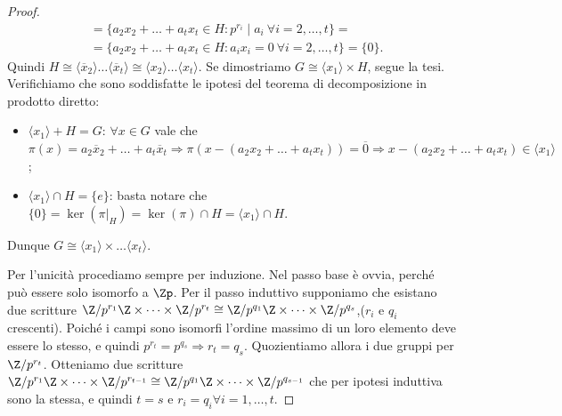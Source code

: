 \begin{proof}
\begin{align}
    & = \{a_2 x_2+\dots+a_t x_t \in H : p^{r_i} \mid a_i \ \forall i = 2,\dots, t\}  = \nonumber \\
    & = \{a_2 x_2+\dots+a_t x_t \in H : a_i x_i =  0 \ \forall i = 2,\dots, t\} = \{0\}. \nonumber 
    \end{align}
    Quindi $H \cong \langle \overline x_2 \rangle \dots \langle \overline x_t \rangle \cong \langle x_2 \rangle \dots  \langle  x_t \rangle$. Se dimostriamo $G \cong \langle x_1 \rangle \times H$, segue la tesi. Verifichiamo che sono soddisfatte le ipotesi del teorema di decomposizione in prodotto diretto: 
    \begin{itemize}
    \item $\langle x_1 \rangle + H  = G$: $\forall x \in G$ vale che $\pi(x) = a_2\overline x_2 + \dots + a_t \overline x_t \Rightarrow \pi(x - (a_2 x_2 + \dots + a_t  x_t)) = \overline0 \Rightarrow x - (a_2 x_2 + \dots + a_t  x_t) \in \langle x_1 \rangle$;
    \item $\langle x_1 \rangle \cap H = \{e\}$: basta notare che $\{0\} = \ker(\pi|_H) = \ker(\pi) \cap H = \langle x_1 \rangle \cap H.$
    \end{itemize}
    Dunque $G \cong \langle x_1 \rangle \times \dots \langle x_t \rangle$.

    Per l'unicità procediamo sempre per induzione. Nel passo base è ovvia, perché può essere solo isomorfo a $\Zp$. Per il passo induttivo supponiamo che esistano due scritture $\Z/p^{r_1}\Z \times \dots \times \Z/p^{r_t} \cong \Z/p^{q_1}\Z \times \dots \times \Z/p^{q_s}$,($r_i$ e $q_i$ crescenti). Poiché i campi sono isomorfi l'ordine massimo di un loro elemento deve essere lo stesso, e quindi  $p^{r_t} = p^{q_s} \Rightarrow r_t = q_s$. Quozientiamo allora i due gruppi per $\Z/p^{r_t}$. Otteniamo due scritture  $\Z/p^{r_1}\Z \times \dots \times \Z/p^{r_{t-1}} \cong \Z/p^{q_1}\Z \times \dots \times \Z/p^{q_{s-1}}$ che per ipotesi induttiva sono la stessa, e quindi $t = s$ e $r_i = q_i \forall i = 1,\dots,t$.
\end{proof}

